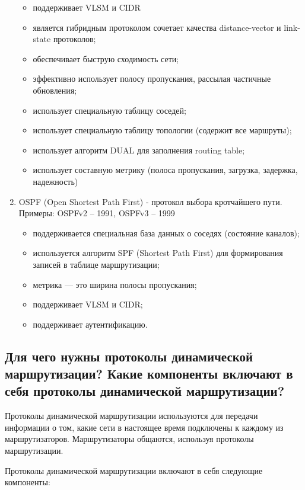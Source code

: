 \begin{enumerate}
    \begin{itemize}
        \item поддерживает VLSM и CIDR
        \item является гибридным протоколом сочетает качества
        distance-vector и link-state протоколов;
        \item обеспечивает быструю сходимость сети;
        \item эффективно использует полосу пропускания,
        рассылая частичные обновления;
        \item использует специальную таблицу соседей;
        \item использует специальную таблицу топологии (содержит все маршруты);
        \item использует алгоритм DUAL для заполнения routing table;
        \item использует составную метрику
        (полоса пропускания, загрузка, задержка, надежность)
    \end{itemize}
    \item OSPF (Open Shortest Path First) - протокол выбора кротчайшего пути.
    Примеры: OSPFv2 – 1991, OSPFv3 – 1999
    \begin{itemize}
        \item поддерживается специальная база данных о соседях
        (состояние каналов);
        \item используется алгоритм SPF (Shortest Path First)
        для формирования записей в таблице маршрутизации;
        \item метрика --- это ширина полосы пропускания;
        \item поддерживает VLSM и CIDR;
        \item поддерживает аутентификацию.
    \end{itemize}
\end{enumerate}

\subsection{Для чего нужны протоколы динамической маршрутизации?
Какие компоненты включают в себя протоколы динамической маршрутизации?}

Протоколы динамической маршрутизации используются для передачи информации
о том, какие сети в настоящее время подключены к каждому из маршрутизаторов.
Маршрутизаторы общаются, используя протоколы маршрутизации.

Протоколы динамической маршрутизации включают в себя следующие компоненты:

